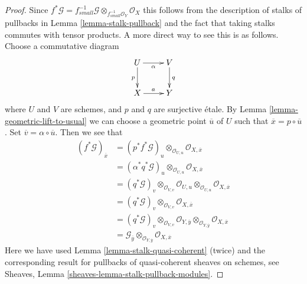 \documentclass[10pt,a4paper]{amsart}
\theoremstyle{plain}
\theoremstyle{definition}
\theoremstyle{remark}
\numberwithin{equation}{subsection}
\begin{document}
\begin{proof}
Since $f^*\mathcal{G} =
f_{small}^{-1}\mathcal{G} \otimes_{f_{small}^{-1}\mathcal{O}_Y} \mathcal{O}_X$
this follows from the description of stalks of pullbacks in
Lemma \ref{lemma-stalk-pullback}
and the fact that taking stalks commutes with tensor products.
A more direct way to see this is as follows.
Choose a commutative diagram
$$
\xymatrix{
U \ar[d]_p \ar[r]_\alpha  & V \ar[d]^q \\
X \ar[r]^a & Y
}
$$
where $U$ and $V$ are schemes, and $p$ and $q$ are surjective \'etale.
By
Lemma \ref{lemma-geometric-lift-to-usual}
we can choose a geometric point $\overline{u}$ of $U$ such that
$\overline{x} = p \circ \overline{u}$. Set
$\overline{v} = \alpha \circ \overline{u}$.
Then we see that
\begin{align*}
(f^*\mathcal{G})_{\overline{x}} & =
(p^*f^*\mathcal{G})_u \otimes_{\mathcal{O}_{U, u}}
\mathcal{O}_{X, \overline{x}} \\
& = (\alpha^*q^*\mathcal{G})_u \otimes_{\mathcal{O}_{U, u}}
\mathcal{O}_{X, \overline{x}} \\
& = (q^*\mathcal{G})_v \otimes_{\mathcal{O}_{V, v}}
\mathcal{O}_{U, u} \otimes_{\mathcal{O}_{U, u}}
\mathcal{O}_{X, \overline{x}} \\
& = (q^*\mathcal{G})_v \otimes_{\mathcal{O}_{V, v}}
\mathcal{O}_{X, \overline{x}} \\
& = (q^*\mathcal{G})_v \otimes_{\mathcal{O}_{V, v}}
\mathcal{O}_{Y, \overline{y}} \otimes_{\mathcal{O}_{Y, \overline{y}}}
\mathcal{O}_{X, \overline{x}} \\
& = \mathcal{G}_{\overline{y}} \otimes_{\mathcal{O}_{Y, \overline{y}}}
\mathcal{O}_{X, \overline{x}}
\end{align*}
Here we have used
Lemma \ref{lemma-stalk-quasi-coherent} (twice)
and the corresponding result for pullbacks of quasi-coherent sheaves
on schemes, see
Sheaves, Lemma \ref{sheaves-lemma-stalk-pullback-modules}.
\end{proof}
\end{document}

